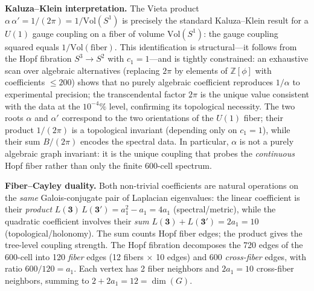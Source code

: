 \documentclass[12pt,a4paper]{article}
\theoremstyle{definition}
\begin{document}
\textbf{Kaluza--Klein interpretation.}  The Vieta product $\alpha\,\alpha' = 1/(2\pi) = 1/\mathrm{Vol}(S^1)$ is precisely the standard Kaluza--Klein result for a $U(1)$ gauge coupling on a fiber of volume $\mathrm{Vol}(S^1)$: the gauge coupling squared equals $1/\mathrm{Vol}(\text{fiber})$.  This identification is structural---it follows from the Hopf fibration $S^3 \to S^2$ with $c_1 = 1$---and is tightly constrained: an exhaustive scan over algebraic alternatives (replacing $2\pi$ by elements of $\mathbb{Z}[\phi]$ with coefficients $\leq 200$) shows that no purely algebraic coefficient reproduces $1/\alpha$ to experimental precision; the transcendental factor $2\pi$ is the unique value consistent with the data at the $10^{-4}\%$ level, confirming its topological necessity.  The two roots $\alpha$ and $\alpha'$ correspond to the two orientations of the $U(1)$ fiber; their product $1/(2\pi)$ is a topological invariant (depending only on $c_1 = 1$), while their sum $B/(2\pi)$ encodes the spectral data.  In particular, $\alpha$ is not a purely algebraic graph invariant: it is the unique coupling that probes the \emph{continuous} Hopf fiber rather than only the finite 600-cell spectrum.

\textbf{Fiber--Cayley duality.}  Both non-trivial coefficients are natural operations on the \emph{same} Galois-conjugate pair of Laplacian eigenvalues: the linear coefficient is their \emph{product} $L(\mathbf{3})\,L(\mathbf{3'}) = a_1^2 - a_1 = 4a_1$ (spectral/metric), while the quadratic coefficient involves their \emph{sum} $L(\mathbf{3}) + L(\mathbf{3'}) = 2a_1 = 10$ (topological/holonomy).  The sum counts Hopf fiber edges; the product gives the tree-level coupling strength.  The Hopf fibration decomposes the 720 edges of the 600-cell into 120 \emph{fiber} edges (12 fibers $\times$ 10 edges) and 600 \emph{cross-fiber} edges, with ratio $600/120 = a_1$.  Each vertex has 2 fiber neighbors and $2a_1 = 10$ cross-fiber neighbors, summing to $2 + 2a_1 = 12 = \dim(G)$.
\end{document}
